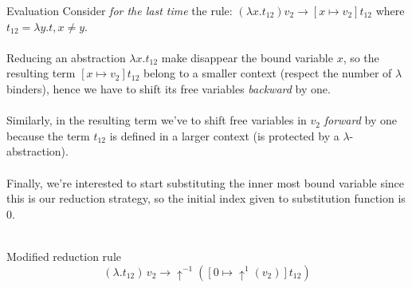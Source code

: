 \documentclass[8pt]{beamer}
\begin{document}
\begin{frame}{Evaluation}
    Consider \emph{for the last time} the rule:
        $(\lambda x.t_{12})v_{2} \rightarrow [x \mapsto v_{2}]t_{12}$ 
        where $t_{12} = \lambda y.t, x\not=y$.
    \\~\\
    \pause
    Reducing an abstraction $\lambda x.t_{12}$ make disappear the bound 
    variable $x$, so the resulting term $[x \mapsto v_{2}]t_{12}$ belong to 
    a smaller context (respect the number of $\lambda$ binders), hence we have to
    shift its free variables \emph{backward} by one.
    \\~\\
    \pause
    Similarly, in the resulting term we've to shift free 
    variables in $v_{2}$ \emph{forward} by one
    because the term $t_{12}$ is defined in a larger context (is protected by
    a $\lambda$-abstraction).
    \\~\\
    \pause
    Finally, we're interested to start substituting the inner most bound
    variable since this is our reduction strategy, so the initial index
    given to substitution function is $0$.
    \\~\\
    \pause
    \begin{block}{Modified reduction rule}
        \begin{displaymath}
            (\lambda.t_{12})\, v_{2} \rightarrow \uparrow^{-1}(
            [0 \mapsto \uparrow^{1}(v_{2})]t_{12})
        \end{displaymath}
    \end{block}
\end{frame}
\end{document}
